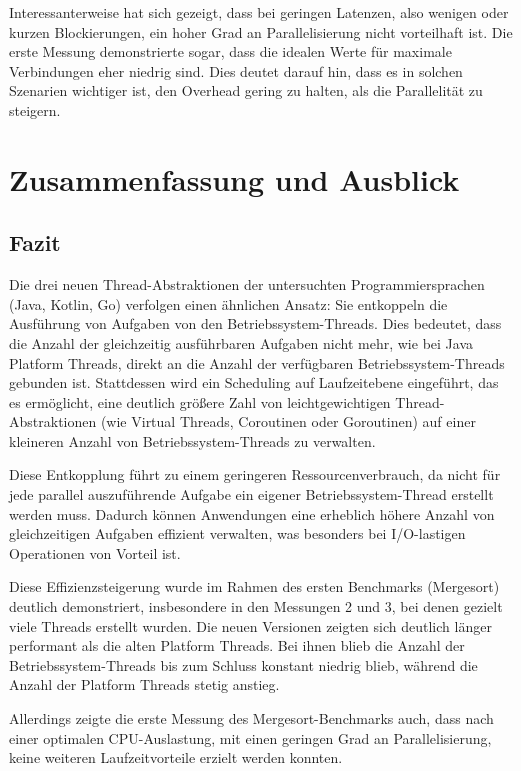 \documentclass[fontsize=12pt,paper=a4,twoside=semi,parskip=half-,headsepline,headinclude]{scrreprt}
\begin{document}
Interessanterweise hat sich gezeigt, dass bei geringen Latenzen, also wenigen oder kurzen Blockierungen, ein hoher Grad an Parallelisierung nicht vorteilhaft ist. Die erste Messung demonstrierte sogar, dass die idealen Werte für maximale Verbindungen eher niedrig sind. Dies deutet darauf hin, dass es in solchen Szenarien wichtiger ist, den Overhead gering zu halten, als die Parallelität zu steigern.

\chapter{Zusammenfassung und Ausblick}

\section{Fazit}

Die drei neuen Thread-Abstraktionen der untersuchten Programmiersprachen (Java, Kotlin, Go) verfolgen einen ähnlichen Ansatz: Sie entkoppeln die Ausführung von Aufgaben von den Betriebssystem-Threads. Dies bedeutet, dass die Anzahl der gleichzeitig ausführbaren Aufgaben nicht mehr, wie bei Java Platform Threads, direkt an die Anzahl der verfügbaren Betriebssystem-Threads gebunden ist. Stattdessen wird ein Scheduling auf Laufzeitebene eingeführt, das es ermöglicht, eine deutlich größere Zahl von leichtgewichtigen Thread-Abstraktionen (wie Virtual Threads, Coroutinen oder Goroutinen) auf einer kleineren Anzahl von Betriebssystem-Threads zu verwalten.

Diese Entkopplung führt zu einem geringeren Ressourcenverbrauch, da nicht für jede parallel auszuführende Aufgabe ein eigener Betriebssystem-Thread erstellt werden muss. Dadurch können Anwendungen eine erheblich höhere Anzahl von gleichzeitigen Aufgaben effizient verwalten, was besonders bei I/O-lastigen Operationen von Vorteil ist.

Diese Effizienzsteigerung wurde im Rahmen des ersten Benchmarks (Mergesort) deutlich demonstriert, insbesondere in den Messungen 2 und 3, bei denen gezielt viele Threads erstellt wurden. Die neuen Versionen zeigten sich deutlich länger performant als die alten Platform Threads. Bei ihnen blieb die Anzahl der Betriebssystem-Threads bis zum Schluss konstant niedrig blieb, während die Anzahl der Platform Threads stetig anstieg. 

Allerdings zeigte die erste Messung des Mergesort-Benchmarks auch, dass nach einer optimalen CPU-Auslastung, mit einen geringen Grad an Parallelisierung, keine weiteren Laufzeitvorteile erzielt werden konnten.
\end{document}
